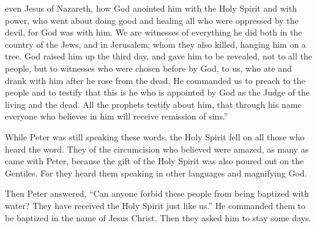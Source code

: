 {even Jesus of Nazareth, how God anointed him with the Holy Spirit and with power, who went about doing good and healing all who were oppressed by the devil, for God was with him.
We are witnesses of everything he did both in the country of the Jews, and in Jerusalem; whom they also killed, hanging him on a tree.
God raised him up the third day, and gave him to be revealed,
not to all the people, but to witnesses who were chosen before by God, to us, who ate and drank with him after he rose from the dead.
He commanded us to preach to the people and to testify that this is he who is appointed by God as the Judge of the living and the dead.
All the prophets testify about him, that through his name everyone who believes in him will receive remission of sins.”
\par }{\PP {}While Peter was still speaking these words, the Holy Spirit fell on all those who heard the word.
They of the circumcision who believed were amazed, as many as came with Peter, because the gift of the Holy Spirit was also poured out on the Gentiles.
For they heard them speaking in other languages and magnifying God.
\par }{\PP Then Peter answered,
“Can anyone forbid these people from being baptized with water? They have received the Holy Spirit just like us.”
He commanded them to be baptized in the name of Jesus Christ. Then they asked him to stay some days.

}
